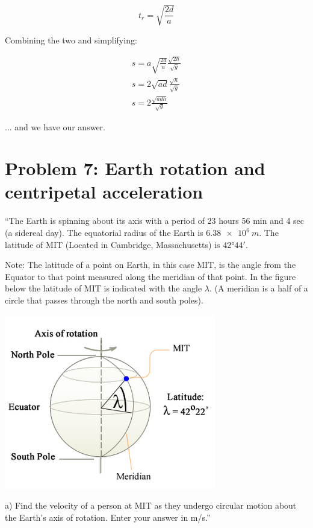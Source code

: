 \documentclass[12pt,a4paper]{report}
\begin{document}
\begin{equation}
t_r = \sqrt{\frac{2 d}{a}}
\end{equation}

Combining the two and simplifying:

\begin{align}
s = a \sqrt{\frac{2 d}{a}} \frac{\sqrt{2h}}{\sqrt{g}}\\
s = 2\sqrt{a d} \frac{\sqrt{h}}{\sqrt{g}}\\
s = 2 \frac{\sqrt{a d h}}{\sqrt{g}}
\end{align}

... and we have our answer.

\section{Problem 7: Earth rotation and centripetal acceleration}

``The Earth is spinning about its axis with a period of 23 hours 56 min and 4 sec (a sidereal day). The equatorial radius of the Earth is $\SI{6.38e6}{m}$. The latitude of MIT (Located in Cambridge, Massachusetts) is $\ang{42;44;}$.

Note: The latitude of a point on Earth, in this case MIT, is the angle from the Equator to that point measured along the meridian of that point. In the figure below the latitude of MIT is indicated with the angle $\lambda$. (A meridian is a half of a circle that passes through the north and south poles).

\begin{center}
\includegraphics[scale=0.75]{Graphics/h2p7}
\end{center}

a) Find the velocity of a person at MIT as they undergo circular motion about the Earth's axis of rotation. Enter your answer in m/s.''
\end{document}
